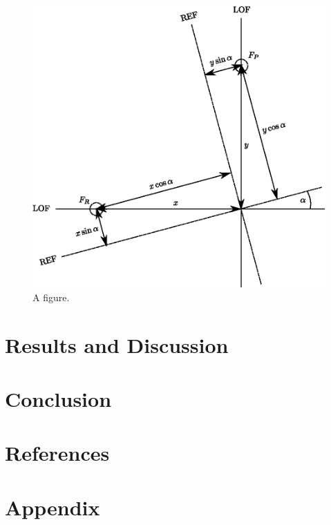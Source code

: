 \documentclass[titlepage,dvipsnames,a4paper,11pt]{article}
\begin{document}
\begin{figure}[H]
    \centering
    \includegraphics[width=14cm]{figure}
    \caption{A figure.}
\end{figure}



\newpage


\section{Results and Discussion}






\section{Conclusion}


\section{References}

\newpage
\section{Appendix}
\end{document}
